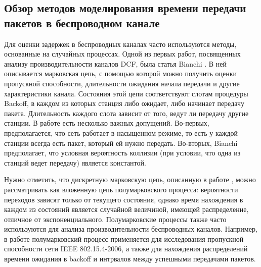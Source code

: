 \subsection{Обзор методов моделирования времени передачи пакетов в беспроводном канале}
Для оценки задержек в беспроводных каналах часто используются методы, основанные на случайных процессах. Одной из первых работ, посвященных анализу производительности каналов DCF, была статья Bianchi \cite{Bianchi2000}. В ней описывается марковская цепь, с помощью которой можно получить оценки пропускной способности, длительности ожидания начала передачи и другие характеристики канала. Состояния этой цепи соответствуют слотам процедуры Backoff, в каждом из которых станция либо ожидает, либо начинает передачу пакета. Длительность каждого слота зависит от того, ведут ли передачу другие станции. В работе \cite{Bianchi2000} есть несколько важных допущений. Во-первых, предполагается, что сеть работает в насыщенном режиме, то есть у каждой станции всегда есть пакет, который ей нужно передать. Во-вторых, Bianchi предполагает, что условная вероятность коллизии (при условии, что одна из станций ведет передачу) является константой.

Нужно отметить, что дискретную марковскую цепь, описанную в работе \cite{Bianchi2000}, можно рассматривать как вложенную цепь полумарковского процесса: вероятности переходов зависят только от текущего состояния, однако время нахождения в каждом из состояний является случайной величиной, имеющей распределение, отличное от экспоненциального. Полумарковские процессы также часто используются для анализа производительности беспроводных каналов. Например, в работе \cite{Lauwens2010} полумарковский процесс применяется для исследования пропускной способности сети  IEEE 802.15.4-2006, а также для нахождения распределений времени ожидания в backoff и интрвалов между успешными передачами пакетов.

